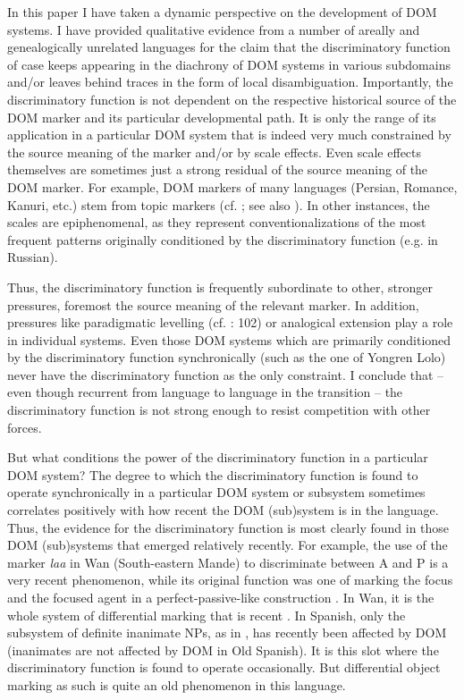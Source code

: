 \documentclass[output=paper]{langsci/langscibook}
\begin{document}
In this paper I have taken a dynamic perspective on the development of DOM systems. I have provided qualitative evidence from a number of areally and genealogically unrelated languages for the claim that the discriminatory function of case keeps appearing in the diachrony of DOM systems in various subdomains and/or leaves behind traces in the form of local disambiguation. Importantly, the discriminatory function is not dependent on the respective historical source of the DOM marker and its particular developmental path. It is only the range of its application in a particular DOM system that is indeed very much constrained by the source meaning of the marker and/or by scale effects. Even scale effects themselves are sometimes just a strong residual of the source meaning of the DOM marker. For example, DOM markers of many languages (Persian, Romance, Kanuri, etc.) stem from topic markers (cf. \citealt{Iemmolo2010,DalrympleNikolaeva2011}; see also ). In other instances, the scales are epiphenomenal, as they represent conventionalizations of the most frequent patterns originally conditioned by the discriminatory function (e.g. in Russian).

Thus, the discriminatory function is frequently subordinate to other, stronger pressures, foremost the source meaning of the relevant marker. In addition, pressures like paradigmatic levelling (cf. \citealt{Jäger2007}: 102) or analogical extension play a role in individual systems. Even those DOM systems which are primarily conditioned by the discriminatory function synchronically (such as the one of Yongren Lolo) never have the discriminatory function as the only constraint. I conclude that – even though recurrent from language to language in the transition – the discriminatory function is not strong enough to resist competition with other forces. 

But what conditions the power of the discriminatory function in a particular DOM system? The degree to which the discriminatory function is found to operate synchronically in a particular DOM system or subsystem sometimes correlates positively with how recent the DOM (sub)system is in the language. Thus, the evidence for the discriminatory function is most clearly found in those DOM (sub)systems that emerged relatively recently. For example, the use of the marker \textit{laa} in Wan (South-eastern Mande) to discriminate between A and P is a very recent phenomenon, while its original function was one of marking the focus and the focused agent in a perfect-passive-like construction \citep{Nikitina2018}. In Wan, it is the whole system of differential marking that is recent \citep{Nikitina2018}. In Spanish, only the subsystem of definite inanimate NPs, as in , has recently been affected by DOM (inanimates are not affected by DOM in Old Spanish). It is this slot where the discriminatory function is found to operate occasionally. But differential object marking as such is quite an old phenomenon in this language.
\end{document}

